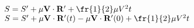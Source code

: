 \documentclass[a4paper,11pt]{article}
\begin{document}
\noindent
{} \\
\Jest $S = S' + \mu \vecVbold \cdot \vecRbold' + \fr{ 1 }{ 2 } \mu V^{ 2 } t$ \\
\Powin $S = S' + \mu \vecVbold \cdot \vecRbold'( t ) - \mu \vecVbold
\cdot \vecRbold'( 0 ) + \fr{ 1 }{ 2 } \mu V^{ 2 } t$ \\


\vspace{\spaceTwo}
















\end{document}
